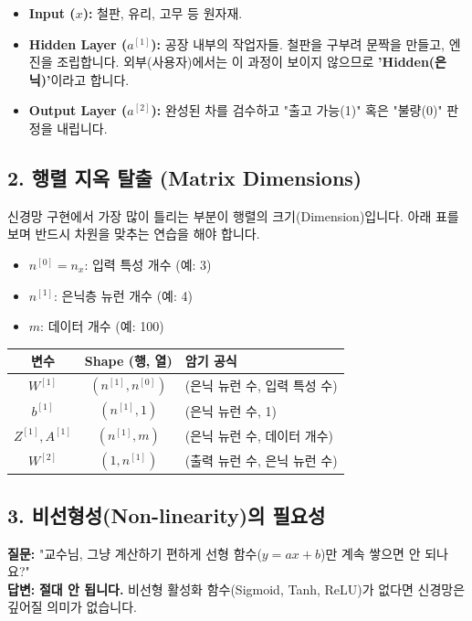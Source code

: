\documentclass[11pt,a4paper]{book}
\theoremstyle{definition}
\begin{document}
\begin{analogybox}[title={자동차 공장 조립 라인}]
\begin{itemize}
    \item \textbf{Input ($x$):} 철판, 유리, 고무 등 원자재.
    \item \textbf{Hidden Layer ($a^{[1]}$):} 공장 내부의 작업자들. 철판을 구부려 문짝을 만들고, 엔진을 조립합니다. 외부(사용자)에서는 이 과정이 보이지 않으므로 \textbf{'Hidden(은닉)'}이라고 합니다.
    \item \textbf{Output Layer ($a^{[2]}$):} 완성된 차를 검수하고 "출고 가능(1)" 혹은 "불량(0)" 판정을 내립니다.
\end{itemize}
\end{analogybox}

\subsection{2. 행렬 지옥 탈출 (Matrix Dimensions)}
신경망 구현에서 가장 많이 틀리는 부분이 행렬의 크기(Dimension)입니다. 아래 표를 보며 반드시 차원을 맞추는 연습을 해야 합니다.

\begin{itemize}
    \item $n^{[0]} = n_x$: 입력 특성 개수 (예: 3)
    \item $n^{[1]}$: 은닉층 뉴런 개수 (예: 4)
    \item $m$: 데이터 개수 (예: 100)
\end{itemize}

\begin{center}
\begin{tabular}{|c|c|l|}
\hline
\textbf{변수} & \textbf{Shape (행, 열)} & \textbf{암기 공식} \\ \hline
$W^{[1]}$ & $(n^{[1]}, n^{[0]})$ & (은닉 뉴런 수, 입력 특성 수) \\ \hline
$b^{[1]}$ & $(n^{[1]}, 1)$ & (은닉 뉴런 수, 1) \\ \hline
$Z^{[1]}, A^{[1]}$ & $(n^{[1]}, m)$ & (은닉 뉴런 수, 데이터 개수) \\ \hline
$W^{[2]}$ & $(1, n^{[1]})$ & (출력 뉴런 수, 은닉 뉴런 수) \\ \hline
\end{tabular}
\end{center}

\subsection{3. 비선형성(Non-linearity)의 필요성}
\textbf{질문:} "교수님, 그냥 계산하기 편하게 선형 함수($y=ax+b$)만 계속 쌓으면 안 되나요?" \\
\textbf{답변:} \textbf{절대 안 됩니다.} 비선형 활성화 함수(Sigmoid, Tanh, ReLU)가 없다면 신경망은 깊어질 의미가 없습니다.
\end{document}
